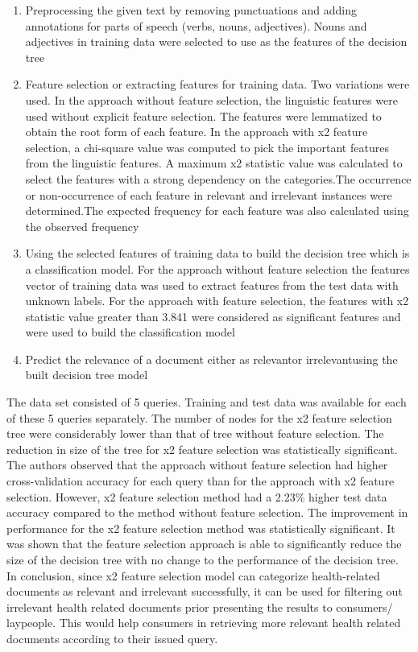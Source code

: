 \documentclass[]{article}
\begin{document}
\begin{enumerate}
\begin{enumerate}
		\item Preprocessing the given text by removing punctuations and adding annotations for parts of speech (verbs, nouns, adjectives). Nouns and adjectives in training data were selected to use as the features of the decision tree
		 
		\item Feature selection or extracting features for training data. Two variations were used. In the approach without feature selection, the linguistic features were used without explicit feature selection. The features were lemmatized to obtain the root form of each feature. In the approach with x2 feature selection, a chi-square value was computed to pick the important features from the linguistic features. A maximum x2 statistic value was calculated to select the features with a strong dependency on the categories.The occurrence or non-occurrence of each feature in relevant and irrelevant instances were determined.The expected frequency for each feature was also calculated using the observed frequency
		
		\item Using the selected features of training data to build the decision tree which is a classification model. For the approach without feature selection the features vector of training data was used to extract features from the test data with unknown labels. For the approach with feature selection, the features with x2 statistic value greater than 3.841 were considered as significant features and were used to build the classification model
		
		\item Predict the relevance of a document either as \textquotesingle relevant\textquotesingle or \textquotesingle irrelevant\textquotesingle using the built decision tree model   
\end{enumerate}

The data set consisted of 5 queries. Training and test data was available for each of these 5 queries separately. The number of nodes for the x2 feature selection tree were considerably lower than that of tree without feature selection. The reduction in size of the tree for x2 feature selection was statistically significant. The authors observed that the approach without feature selection had higher cross-validation accuracy for each query than for the approach with x2 feature selection. However, x2 feature selection method had a 2.23\% higher test data accuracy compared to the method without feature selection. The improvement in performance for the x2 feature selection method was statistically significant. It was shown that the feature selection approach is able to significantly reduce the size of the decision tree with no change to the performance of the decision tree. In conclusion, since x2 feature selection model can categorize health-related documents as relevant and irrelevant successfully, it can be used for filtering out irrelevant health related documents prior presenting the results to consumers/ laypeople. This would help consumers in retrieving more relevant health related documents according to their issued query. \\


\end{enumerate}
\end{document}
